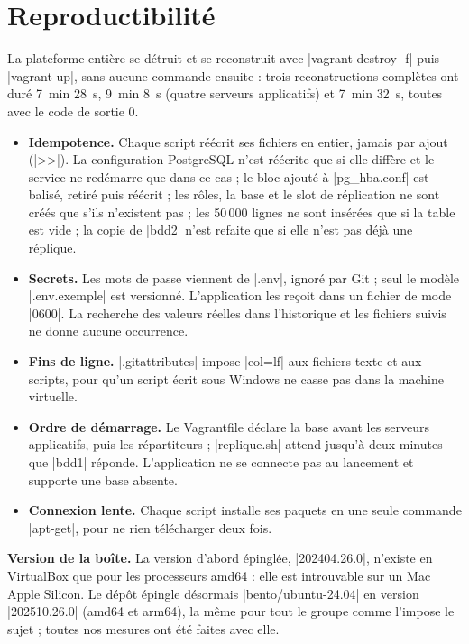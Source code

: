 \documentclass[a4paper,11pt]{article}
\begin{document}
\section{Reproductibilité}

La plateforme entière se détruit et se reconstruit avec |vagrant destroy -f| puis |vagrant up|, sans aucune commande ensuite : trois reconstructions complètes ont duré 7~min 28~s, 9~min 8~s (quatre serveurs applicatifs) et 7~min 32~s, toutes avec le code de sortie 0.

\begin{itemize}
  \item \textbf{Idempotence.} Chaque script réécrit ses fichiers en entier, jamais par ajout (|>>|). La configuration PostgreSQL n'est réécrite que si elle diffère et le service ne redémarre que dans ce cas ; le bloc ajouté à |pg_hba.conf| est balisé, retiré puis réécrit ; les rôles, la base et le slot de réplication ne sont créés que s'ils n'existent pas ; les 50\,000 lignes ne sont insérées que si la table est vide ; la copie de |bdd2| n'est refaite que si elle n'est pas déjà une réplique.
  \item \textbf{Secrets.} Les mots de passe viennent de |.env|, ignoré par Git ; seul le modèle |.env.exemple| est versionné. L'application les reçoit dans un fichier de mode |0600|. La recherche des valeurs réelles dans l'historique et les fichiers suivis ne donne aucune occurrence.
  \item \textbf{Fins de ligne.} |.gitattributes| impose |eol=lf| aux fichiers texte et aux scripts, pour qu'un script écrit sous Windows ne casse pas dans la machine virtuelle.
  \item \textbf{Ordre de démarrage.} Le Vagrantfile déclare la base avant les serveurs applicatifs, puis les répartiteurs ; |replique.sh| attend jusqu'à deux minutes que |bdd1| réponde. L'application ne se connecte pas au lancement et supporte une base absente.
  \item \textbf{Connexion lente.} Chaque script installe ses paquets en une seule commande |apt-get|, pour ne rien télécharger deux fois.
\end{itemize}

\textbf{Version de la boîte.} La version d'abord épinglée, |202404.26.0|, n'existe en VirtualBox que pour les processeurs amd64 : elle est introuvable sur un Mac Apple Silicon. Le dépôt épingle désormais |bento/ubuntu-24.04| en version |202510.26.0| (amd64 et arm64), la même pour tout le groupe comme l'impose le sujet ; toutes nos mesures ont été faites avec elle.
\end{document}
